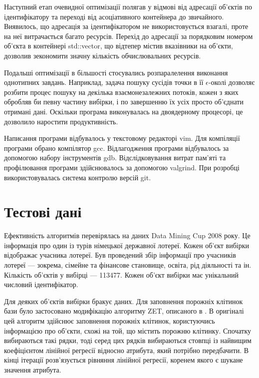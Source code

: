            Наступний етап очевидної оптимізації полягав у відмові від адресації об'єктів по ідентифікатору та переході від асоціативного контейнера до звичайного. Виявилось, що адресація за ідентифікатором не використовується взагалі, проте на неї витрачається багато ресурсів. Перехід до адресації за порядковим номером об'єкта в контейнері std::vector, що відтепер містив вказівники на об'єкти, дозволив зекономити значну кількість обчислювальних ресурсів.
            
            Подальші оптимізації в більшості стосувались розпаралелення виконання однотипних завдань. Наприклад, задача пошуку сусідів точки в її $\epsilon$-околі дозволяє розбити процес пошуку на декілька взаємонезалежних потоків, кожен з яких обробляв би певну частину вибірки, і по завершенню їх усіх просто об'єднати отримані дані. Оскільки програма виконувалась на двоядерному процесорі, це дозволило наростити продуктивність.
            
            Написання програми відбувалось у текстовому редакторі vim. Для компіляції програми обрано компілятор gcc. Відлагодження програми відбувалось за допомогою набору інструментів gdb. Відслідковування витрат пам'яті та профілювання програми здійснювалось за допомогою valgrind. При розробці використовувалась система контролю версій git.            
            
    \section {Тестові дані}
            Ефективність алгоритмів перевірялась на даних Data Mining Cup 2008 року. Це інформація про один із турів німецької державної лотереї. Кожен об'єкт вибірки відображає учасника лотереї. Був проведений збір інформації про учасників лотереї --- зокрема, сімейне та фінансове становище, освіта, рід діяльності та ін. Кількість об'єктів у вибірці --- 113477. Кожен об'єкт вибірки має унікальний числовий ідентифікатор.
            
            Для деяких об'єктів вибірки бракує даних. Для заповнення порожніх клітинок бази було застосовано модифікацію алгоритму ZET, описаного в \cite{Zagorujko}. В оригіналі цей алгоритм здійснює заповнення порожніх клітинок, користуючись інформацією про об'єкти, схожі на той, що містить порожню клітинку. Спочатку вибираються такі рядки, тоді серед цих рядків вибираються стовпці із найвищим коефіцієнтом лінійної регресії відносно атрибута, який потрібно передбачити. В кінці ітерації розв'язується рівняння лінійної регресії, коренем якого є шукане значення атрибута.
            
